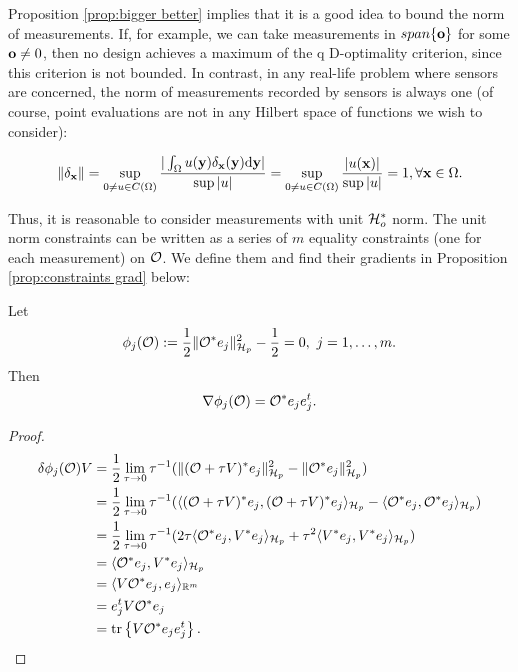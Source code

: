 Proposition \ref{prop:bigger better} implies that it is a good idea to
bound the norm of measurements. If, for example, we can take
measurements in $span\{\mathbf{o}\}$ for some $\mathbf{o} \neq 0$, then no
design achieves a maximum of the q D-optimality criterion, since this
criterion is not bounded. In contrast, in any real-life problem where
sensors are concerned, the norm of measurements recorded by sensors is
always one (of course, point evaluations are not in any Hilbert space
of functions we wish to consider):

\begin{equation}
  \| \delta_{\mathbf{x}} \| = \sup_{0 \neq u \in C(\Omega)}
  \frac{
    |\int_{\Omega}u(\mathbf{y}) \delta_{\mathbf{x}}(\mathbf{y}) \text{\textup{d}} \mathbf{y}|
  }{
    \sup|u|
  } = \sup_{0 \neq u \in C(\Omega)} \frac{|u(\mathbf{x})|}{\sup|u|} = 1,
  \forall \mathbf{x} \in \Omega.
\end{equation}

Thus, it is reasonable to consider measurements with unit $\mathcal{H}_o^*$
norm. The unit norm constraints can be written as a series of $m$
equality constraints (one for each measurement) on $\mathcal{O}$. We define
them and find their gradients in Proposition \ref{prop:constraints
  grad} below:

\begin{proposition}\label{prop:constraints grad}
  Let
  \begin{align*}
    \phi_j(\mathcal{O}) :=\frac12 \| \mathcal{O}^* e_j\|_{\mathcal{H}_p}^2 - \frac12 = 0,\ j=1,\dots,m.
  \end{align*}
  Then
  \begin{equation*}
    \nabla \phi_j(\mathcal{O}) = \mathcal{O}^* e_je_j^t.
  \end{equation*}
\end{proposition}

\begin{proof}
  \begin{align*}
    \delta \phi_j(\mathcal{O})V  
    &= \frac12\lim_{\tau \to 0}\tau^{-1}
    ( \|(\mathcal{O} + \tau V)^*e_j \|_{\mathcal{H}_p}^2 - \|\mathcal{O} ^*e_j \|_{\mathcal{H}_p}^2  ) \\
    &= \frac12\lim_{\tau \to 0}\tau^{-1}
    ( \langle (\mathcal{O} + \tau V)^*e_j, (\mathcal{O} + \tau V)^*e_j \rangle_{\mathcal{H}_p} - 
    \langle \mathcal{O}^*e_j, \mathcal{O}^*e_j \rangle_{\mathcal{H}_p} ) \\
    &= \frac12\lim_{\tau \to 0}\tau^{-1}
    (2\tau \langle \mathcal{O}^*e_j,V^*e_j \rangle_{\mathcal{H}_p} 
    +\tau^2 \langle V^*e_j, V^*e_j \rangle_{\mathcal{H}_p} ) \\
    &= \langle \mathcal{O}^*e_j,V^*e_j \rangle_{\mathcal{H}_p} \\
    &= \langle V \mathcal{O}^*e_j,e_j \rangle_{\mathbb{R}^m} \\
    &= e_j^t V \mathcal{O}^* e_j \\
    &= \textup{tr}\left \{V \mathcal{O}^* e_je_j^t \right \}.
  \end{align*}
\end{proof}


